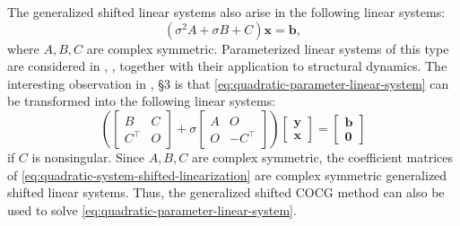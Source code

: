 {The generalized shifted linear systems also arise in the following linear systems:}
\begin{equation}\label{eq:quadratic-parameter-linear-system}(\sigma^2A+\sigma B+C)\bm x=\bm b,\end{equation}
{where $A,B,C$ are complex symmetric. Parameterized linear systems of this type are considered in , , together with their application to structural dynamics. The interesting observation in , \S3 is that \eqref{eq:quadratic-parameter-linear-system} can be transformed into the following linear systems:}
\begin{equation}\label{eq:quadratic-system-shifted-linearization}\left(\begin{bmatrix}B&C\\C^{\top}&O\end{bmatrix}+\sigma\begin{bmatrix}A&O\\O&-C^{\top}\end{bmatrix}\right)\begin{bmatrix}\bm y\\\bm x\end{bmatrix}=\begin{bmatrix}\bm b\\\bm0\end{bmatrix}\end{equation}
{if $C$ is nonsingular. Since $A,B,C$ are complex symmetric, the coefficient matrices of \eqref{eq:quadratic-system-shifted-linearization} are complex symmetric generalized shifted linear systems. Thus, the generalized shifted COCG method can also be used to solve \eqref{eq:quadratic-parameter-linear-system}.}

